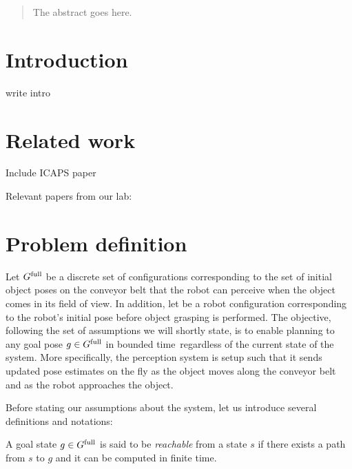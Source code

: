 \documentclass[conference]{IEEEtran}
\begin{document}
\begin{abstract}
The abstract goes here.
\end{abstract}

\IEEEpeerreviewmaketitle

\section{Introduction}
write intro

\section{Related work}
Include ICAPS paper~\cite{ISL19}

Relevant papers from our lab:
~\cite{menon2014motion}
~\cite{cowley2013perception}


\section{Problem definition}

Let $G^{\textrm{full}}$ be a discrete set of configurations corresponding to the set of initial object poses on the conveyor belt that the robot can perceive when the object comes in its field of view. 
%
In addition, let \Shome be a robot configuration corresponding to the robot's initial pose before object grasping is performed.
%
The objective, following the set of assumptions we will shortly state, is to enable planning to any goal pose $ g \in G^{\textrm{full}}$ in bounded time~\Tbound regardless of the current state of the system.
More specifically, the perception system is setup such that it sends updated pose estimates on the fly as the object moves along the conveyor belt and as the robot approaches the object.   


Before stating our assumptions about the system, let us introduce several definitions and notations:
\begin{definition}
    A goal state $g \in G^{\textrm{full}}$ is said to be \emph{reachable} from a state $s$ if there exists a path from $s$ to $g$ and it can be computed in finite time.
\end{definition}
\end{document}
